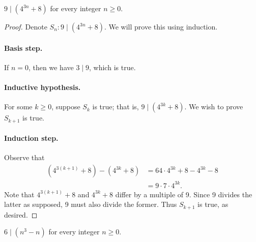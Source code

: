 \documentclass{exam}
\begin{document}
\begin{proposition}{10.12}
    $9\mid(4^{3n}+8)$ for every integer $n\ge 0$.
\end{proposition}

\begin{proof}
    Denote $S_n:9\mid(4^{3n}+8)$. We will prove this using induction.
    \paragraph{Basis step.} If $n=0$, then we have $3\mid9$, which is true.
    \paragraph{Inductive hypothesis.} For some $k\ge0$, suppose $S_k$ is true; that is, $9\mid(4^{3k}+8)$. We wish to prove $S_{k+1}$ is true.
    \paragraph{Induction step.} Observe that
    \begin{align*}
        (4^{3(k+1)}+8) - (4^{3k}+8)&= 64\cdot4^{3k}+8-4^{3k}-8\\
        &=9\cdot7\cdot4^{3k}.
    \end{align*}
    Note that $4^{3(k+1)}+8$ and $4^{3k}+8$ differ by a multiple of 9. Since 9 divides the latter as supposed, 9 must also divide the former. Thus $S_{k+1}$ is true, as desired.
\end{proof}

\begin{proposition}{10.13}
    $6\mid(n^3-n)$ for every integer $n\ge0$.
\end{proposition}
\end{document}
